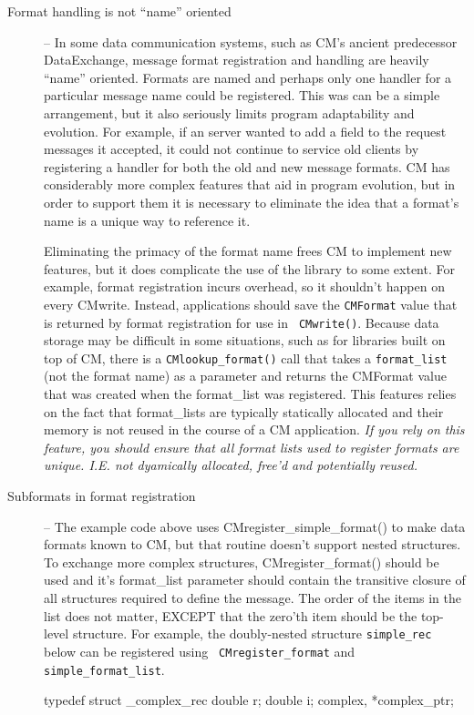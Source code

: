 \documentclass[11pt]{article}
\begin{document}
\begin{description}
\item[Format handling is not ``name'' oriented] --  In some data
  communication systems, such as CM's ancient predecessor DataExchange,
  message format registration and handling are heavily ``name'' oriented.
  Formats are named and perhaps only one handler for a particular message
  name could be registered. This was can be a simple arrangement, but it
  also seriously limits program 
adaptability and evolution.  For example, if an server wanted to add a field
to the request messages it accepted, it could not continue to service old
clients by registering a handler for both the old and new message formats.
CM has considerably more complex features that aid in program evolution, but
in order to support them it is necessary to eliminate the idea that a
format's name is a unique way to reference it.
 
Eliminating the primacy of the format name frees CM to implement new
features, but it does complicate the use of the library to some extent.  For
example, format registration incurs overhead, so it shouldn't happen on
every CMwrite.  Instead, applications should save the 
{\tt CMFormat} value that is returned by format registration for use in {\tt
CMwrite()}.  Because data storage may be difficult in some situations, such
as for libraries built on top of CM, there is a {\tt CMlookup\_format()}
call that takes a {\tt format\_list} (not the format name) as a parameter
and returns the CMFormat value that was created when the format\_list was
registered.  This features relies on the fact that format\_lists are
typically statically allocated and their memory is not reused in the course
of a CM application.  {\it If you rely on this feature, you should ensure
  that all format lists used to register formats are unique.  I.E. not
  dyamically allocated, free'd and potentially reused.}

\item[Subformats in format registration] -- The example code above uses
  CMregister\_simple\_format() to make data formats known to CM, but that
  routine doesn't support nested structures.  To exchange more complex
  structures, CMregister\_format() should be used and it's format\_list
  parameter should contain the transitive closure of all structures required
  to define the message.  The order of the items in the list does not
  matter, EXCEPT that the zero'th item should be the top-level structure.
For example, the doubly-nested
structure {\tt simple\_rec} below can be registered using {\tt
CMregister\_format} and {\tt simple\_format\_list}.
\begin{verbatimtab}
	typedef struct _complex_rec {
	    double r;
	    double i;
	} complex, *complex_ptr;
	

\end{verbatimtab}
\end{description}
\end{document}
